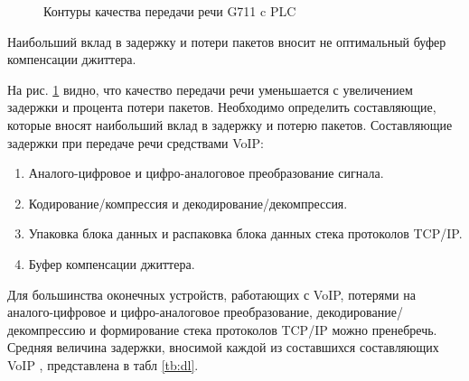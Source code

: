 \pgfplotsset{width=15cm, height=10cm, compat=1.3}
\begin{figure} [h]
  \center
{}
\caption{Контуры качества передачи речи G711 c PLC}
  \label{img1:qos_dd}
\end{figure}



Наибольший вклад в задержку и потери пакетов вносит не оптимальный буфер компенсации джиттера. 

На рис. \ref{img1:qos_dd} видно, что качество передачи
речи уменьшается с увеличением задержки и
процента потери пакетов. Необходимо определить составляющие, которые вносят
наибольший вклад в задержку и потерю пакетов.
Составляющие задержки при передаче речи средствами VoIP:
\begin{enumerate}
 \item Аналого-цифровое и цифро-аналоговое преобразование сигнала.
 \item Кодирование/компрессия и декодирование/декомпрессия.
 \item Упаковка блока данных и распаковка блока данных стека протоколов TCP/IP.
 \item Буфер компенсации джиттера.
\end{enumerate}

Для большинства оконечных устройств, работающих с VoIP, потерями на аналого-цифровое и цифро-аналоговое преобразование, 
декодирование/декомпрессию и формирование стека протоколов TCP/IP можно пренебречь. 
Средняя величина задержки, вносимой каждой из составшихся составляющих VoIP \cite{G114,Y1541}, представлена в табл \ref{tb:dl}.


